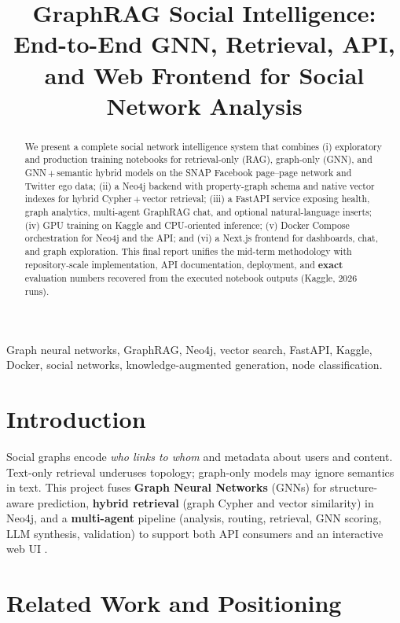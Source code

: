 \documentclass[conference]{IEEEtran}
\title{GraphRAG Social Intelligence: End-to-End GNN, Retrieval, API, and Web Frontend for Social Network Analysis}
\author{%
\IEEEauthorblockN{Neeraj Yadav\textsuperscript{*},
Dev Singh\textsuperscript{**},
Gourav Varanasi}%
\IEEEauthorblockA{\textit{Department of Computer Science}\\
\textit{Shiv Nadar University}\\
Greater Noida, India\\
\textsuperscript{*}Student ID: 2310110199 \quad
\textsuperscript{**}Student ID: 2310110099}%
}
\begin{document}
\maketitle

\begin{abstract}
We present a complete social network intelligence system that combines (i) exploratory and production training notebooks for retrieval-only (RAG), graph-only (GNN), and GNN\,$+$\,semantic hybrid models on the SNAP Facebook page--page network and Twitter ego data; (ii) a Neo4j backend with property-graph schema and native vector indexes for hybrid Cypher\,$+$\,vector retrieval; (iii) a FastAPI service exposing health, graph analytics, multi-agent GraphRAG chat, and optional natural-language inserts; (iv) GPU training on Kaggle and CPU-oriented inference; (v) Docker Compose orchestration for Neo4j and the API; and (vi) a Next.js frontend for dashboards, chat, and graph exploration. This final report unifies the mid-term methodology with repository-scale implementation, API documentation, deployment, and \textbf{exact} evaluation numbers recovered from the executed notebook outputs (Kaggle, 2026 runs).
\end{abstract}

\begin{IEEEkeywords}
Graph neural networks, GraphRAG, Neo4j, vector search, FastAPI, Kaggle, Docker, social networks, knowledge-augmented generation, node classification.
\end{IEEEkeywords}

\section{Introduction}

Social graphs encode \emph{who links to whom} and metadata about users and content. Text-only retrieval underuses topology; graph-only models may ignore semantics in text. This project fuses \textbf{Graph Neural Networks} (GNNs) for structure-aware prediction, \textbf{hybrid retrieval} (graph Cypher and vector similarity) in Neo4j, and a \textbf{multi-agent} pipeline (analysis, routing, retrieval, GNN scoring, LLM synthesis, validation) to support both API consumers and an interactive web UI \cite{project_readme,project_explain,feature_readme}.

\section{Related Work and Positioning}
\end{document}
